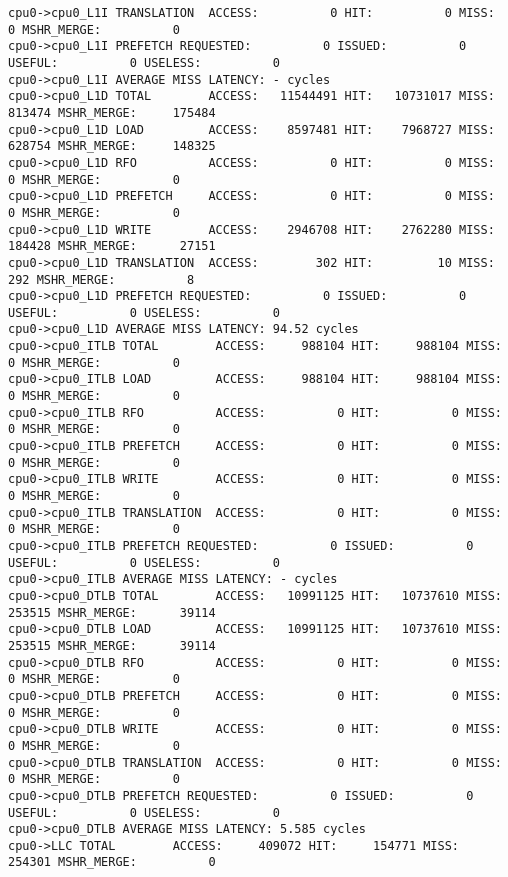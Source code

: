 \documentclass[17pt]{article}
\begin{document}
\begin{LTR}
\begin{lstlisting}[basicstyle=\tiny\ttfamily]
cpu0->cpu0_L1I TRANSLATION  ACCESS:          0 HIT:          0 MISS:          0 MSHR_MERGE:          0
cpu0->cpu0_L1I PREFETCH REQUESTED:          0 ISSUED:          0 USEFUL:          0 USELESS:          0
cpu0->cpu0_L1I AVERAGE MISS LATENCY: - cycles
cpu0->cpu0_L1D TOTAL        ACCESS:   11544491 HIT:   10731017 MISS:     813474 MSHR_MERGE:     175484
cpu0->cpu0_L1D LOAD         ACCESS:    8597481 HIT:    7968727 MISS:     628754 MSHR_MERGE:     148325
cpu0->cpu0_L1D RFO          ACCESS:          0 HIT:          0 MISS:          0 MSHR_MERGE:          0
cpu0->cpu0_L1D PREFETCH     ACCESS:          0 HIT:          0 MISS:          0 MSHR_MERGE:          0
cpu0->cpu0_L1D WRITE        ACCESS:    2946708 HIT:    2762280 MISS:     184428 MSHR_MERGE:      27151
cpu0->cpu0_L1D TRANSLATION  ACCESS:        302 HIT:         10 MISS:        292 MSHR_MERGE:          8
cpu0->cpu0_L1D PREFETCH REQUESTED:          0 ISSUED:          0 USEFUL:          0 USELESS:          0
cpu0->cpu0_L1D AVERAGE MISS LATENCY: 94.52 cycles
cpu0->cpu0_ITLB TOTAL        ACCESS:     988104 HIT:     988104 MISS:          0 MSHR_MERGE:          0
cpu0->cpu0_ITLB LOAD         ACCESS:     988104 HIT:     988104 MISS:          0 MSHR_MERGE:          0
cpu0->cpu0_ITLB RFO          ACCESS:          0 HIT:          0 MISS:          0 MSHR_MERGE:          0
cpu0->cpu0_ITLB PREFETCH     ACCESS:          0 HIT:          0 MISS:          0 MSHR_MERGE:          0
cpu0->cpu0_ITLB WRITE        ACCESS:          0 HIT:          0 MISS:          0 MSHR_MERGE:          0
cpu0->cpu0_ITLB TRANSLATION  ACCESS:          0 HIT:          0 MISS:          0 MSHR_MERGE:          0
cpu0->cpu0_ITLB PREFETCH REQUESTED:          0 ISSUED:          0 USEFUL:          0 USELESS:          0
cpu0->cpu0_ITLB AVERAGE MISS LATENCY: - cycles
cpu0->cpu0_DTLB TOTAL        ACCESS:   10991125 HIT:   10737610 MISS:     253515 MSHR_MERGE:      39114
cpu0->cpu0_DTLB LOAD         ACCESS:   10991125 HIT:   10737610 MISS:     253515 MSHR_MERGE:      39114
cpu0->cpu0_DTLB RFO          ACCESS:          0 HIT:          0 MISS:          0 MSHR_MERGE:          0
cpu0->cpu0_DTLB PREFETCH     ACCESS:          0 HIT:          0 MISS:          0 MSHR_MERGE:          0
cpu0->cpu0_DTLB WRITE        ACCESS:          0 HIT:          0 MISS:          0 MSHR_MERGE:          0
cpu0->cpu0_DTLB TRANSLATION  ACCESS:          0 HIT:          0 MISS:          0 MSHR_MERGE:          0
cpu0->cpu0_DTLB PREFETCH REQUESTED:          0 ISSUED:          0 USEFUL:          0 USELESS:          0
cpu0->cpu0_DTLB AVERAGE MISS LATENCY: 5.585 cycles
cpu0->LLC TOTAL        ACCESS:     409072 HIT:     154771 MISS:     254301 MSHR_MERGE:          0

\end{lstlisting}
\end{LTR}
\end{document}
